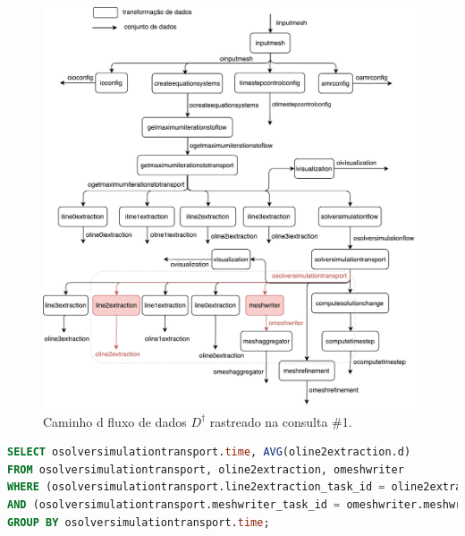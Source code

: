 \begin{figure}[htb]
    \centering
    \includegraphics[width=\textwidth]{img/experiments-dataflow-1}
    \caption[Caminho do fluxo de dados \(D^{\dagger}\) rastreado na consulta \#1]{Caminho d fluxo de dados \(D^{\dagger}\) rastreado na consulta \#1.}%
    \label{fig:experiments-dataflow-1}
\end{figure}

\begin{minipage}[c]{0.95\textwidth}
\begin{lstlisting}[language=sql,label={lst:experiments-1-sql},caption={[Código em SQL gerado na consulta~\#1]Código em SQL gerado na consulta~\#1 (40,29~ms).}]
SELECT osolversimulationtransport.time, AVG(oline2extraction.d)
FROM osolversimulationtransport, oline2extraction, omeshwriter
WHERE (osolversimulationtransport.line2extraction_task_id = oline2extraction.line2extraction_task_id) 
AND (osolversimulationtransport.meshwriter_task_id = omeshwriter.meshwriter_task_id)
GROUP BY osolversimulationtransport.time;
\end{lstlisting}
\end{minipage}

